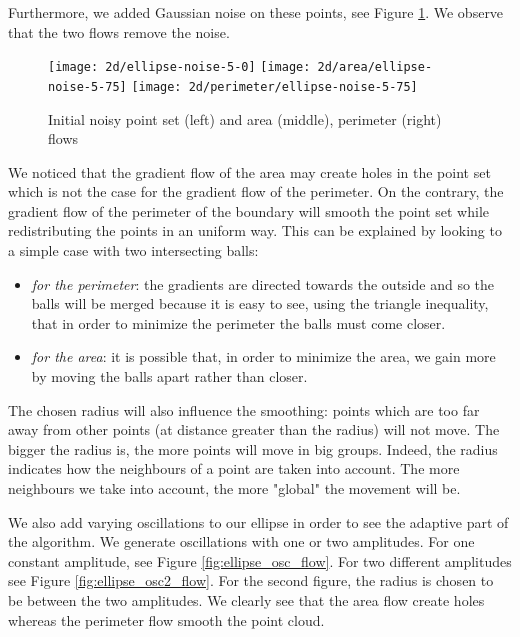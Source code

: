 Furthermore, we added Gaussian noise on these points, see Figure
\ref{fig:ellipse_noise_flow}. We observe that the two flows remove the noise.

\begin{figure}[h]
    \centering

    \texttt{[image: 2d/ellipse-noise-5-0]}
    \texttt{[image: 2d/area/ellipse-noise-5-75]}
    \texttt{[image: 2d/perimeter/ellipse-noise-5-75]}
    \caption{Initial noisy point set (left) and area (middle), perimeter
        (right) flows}

    \label{fig:ellipse_noise_flow}
\end{figure}

We noticed that the gradient flow of the area may create holes in the point set
which is not the case for the gradient flow of the perimeter.  On the contrary,
the gradient flow of the perimeter of the boundary will smooth the point set
while redistributing the points in an uniform way.  This can be explained by
looking to a simple case with two intersecting balls:
\begin{itemize}
    \item \textit{for the perimeter}: the gradients are directed towards the
        outside and so the balls will be merged because it is easy to see, using
        the triangle inequality, that in order to minimize the perimeter the
        balls must come closer.
    \item \textit{for the area}: it is possible that, in order to minimize the
        area, we gain more by moving the balls apart rather than closer.
\end{itemize}

The chosen radius will also influence the smoothing: points which are too far
away from other points (at distance greater than the radius) will not move. The
bigger the radius is, the more points will move in big groups. Indeed, the
radius indicates how the neighbours of a point are taken into account. The more
neighbours we take into account, the more "global" the movement will be.

We also add varying oscillations to our ellipse in order to see the adaptive
part of the algorithm. We generate oscillations with one or two amplitudes. For
one constant amplitude, see Figure \ref{fig:ellipse_osc_flow}. For two different
amplitudes see Figure \ref{fig:ellipse_osc2_flow}. For the second figure, the
radius is chosen to be between the two amplitudes. We clearly see that the area
flow create holes whereas the perimeter flow smooth the point cloud.

